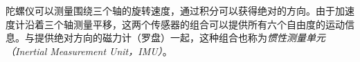 
陀螺仪可以测量围绕三个轴的旋转速度，通过积分可以获得绝对的方向。由于加速度计沿着三个轴测量平移，这两个传感器的组合可以提供所有六个自由度的运动信息。与提供绝对方向的磁力计（罗盘）一起，这种组合也称为\emph{惯性测量单元（Inertial Measurement Unit，IMU）}。



